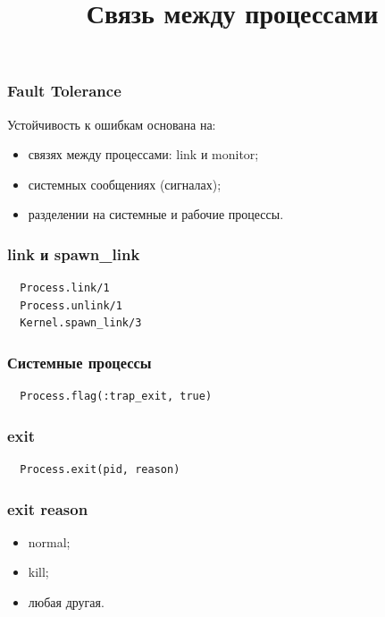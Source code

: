 \documentclass[10pt]{beamer}
\title{Связь между процессами}
\begin{document}
\begin{frame}
  \frametitle{Fault Tolerance}
  Устойчивость к ошибкам основана на:
  \begin{itemize}
    \item связях между процессами: link и monitor;
    \item системных сообщениях (сигналах);
    \item разделении на системные и рабочие процессы.
  \end{itemize}
\end{frame}

\begin{frame}[fragile]
  \frametitle{link и spawn\_link}
  \begin{lstlisting}
  Process.link/1
  Process.unlink/1
  Kernel.spawn_link/3
  \end{lstlisting}
\end{frame}

\begin{frame}[fragile]
  \frametitle{Системные процессы}
  \begin{lstlisting}
  Process.flag(:trap_exit, true)
  \end{lstlisting}
\end{frame}

\begin{frame}[fragile]
  \frametitle{exit}
  \begin{lstlisting}
  Process.exit(pid, reason)
  \end{lstlisting}
\end{frame}

\begin{frame}
  \frametitle{exit reason}
  \begin{itemize}
    \item normal;
    \item kill;
    \item любая другая.
  \end{itemize}
\end{frame}
\end{document}
